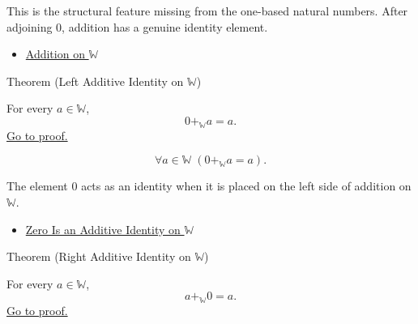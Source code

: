 \begin{remark*}[Interpretation]
This is the structural feature missing from the one-based natural numbers.
After adjoining $0$, addition has a genuine identity element.
\end{remark*}

\begin{dependencies}
\begin{itemize}
  \item \hyperref[def:addition-on-w]{Addition on $\mathbb{W}$}
\end{itemize}
\end{dependencies}

\begin{theorembox}{Theorem (Left Additive Identity on \texorpdfstring{$\mathbb{W}$}{W})}
\begin{theorem}
\label{thm:left-additive-identity-on-w}
For every $a\in\mathbb{W}$,
\[
0+_{\mathbb{W}}a=a.
\]
\hyperref[prf:left-additive-identity-on-w]{Go to proof.}
\end{theorem}
\end{theorembox}

\begin{remark*}
\[
\forall a\in\mathbb{W}\;(0+_{\mathbb{W}}a=a).
\]
\end{remark*}

\begin{remark*}[Interpretation]
The element $0$ acts as an identity when it is placed on the left side of
addition on $\mathbb{W}$.
\end{remark*}

\begin{dependencies}
\begin{itemize}
  \item \hyperref[thm:zero-additive-identity-on-w]{Zero Is an Additive Identity on $\mathbb{W}$}
\end{itemize}
\end{dependencies}

\begin{theorembox}{Theorem (Right Additive Identity on \texorpdfstring{$\mathbb{W}$}{W})}
\begin{theorem}
\label{thm:right-additive-identity-on-w}
For every $a\in\mathbb{W}$,
\[
a+_{\mathbb{W}}0=a.
\]
\hyperref[prf:right-additive-identity-on-w]{Go to proof.}
\end{theorem}
\end{theorembox}

